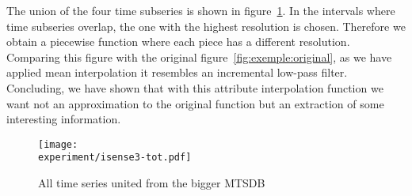 The union of the four time subseries is shown in
figure~\ref{fig:exemple:4mrdtot}. In the intervals where time
subseries overlap, the one with the highest resolution is
chosen. Therefore we obtain a piecewise function where each piece has
a different resolution. Comparing this figure with the original
figure~\ref{fig:exemple:original}, as we have applied mean
interpolation it resembles an incremental low-pass filter. Concluding,
we have shown that with this attribute interpolation function we want
not an approximation to the original function but an extraction of
some interesting information.



\begin{figure}[tp]
\centering
\texttt{[image: \\experiment/isense3-tot.pdf]}
\caption{All time series united from the bigger MTSDB}
\label{fig:exemple:4mrdtot}
\end{figure}




